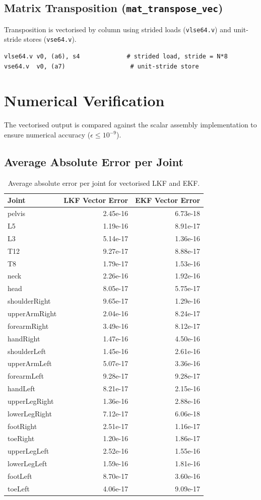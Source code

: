 \documentclass{article}
\begin{document}
\subsection{Matrix Transposition (\texttt{mat\_transpose\_vec})}
Transposition is vectorised by column using strided loads (\texttt{vlse64.v}) and unit-stride stores (\texttt{vse64.v}).
\begin{verbatim}
vlse64.v v0, (a6), s4             # strided load, stride = N*8
vse64.v  v0, (a7)                  # unit-stride store
\end{verbatim}

\section{Numerical Verification}
The vectorised output is compared against the scalar assembly implementation to ensure numerical accuracy ($\epsilon \le 10^{-9}$).

\subsection{Average Absolute Error per Joint}
\begin{table}[ht]
\centering
\begin{tabular}{|l|r|r|}
\hline
Joint & LKF Vector Error & EKF Vector Error \\
\hline
pelvis & 2.45e-16 & 6.73e-18 \\
L5 & 1.19e-16 & 8.91e-17 \\
L3 & 5.14e-17 & 1.36e-16 \\
T12 & 9.27e-17 & 8.88e-17 \\
T8 & 1.79e-17 & 1.53e-16 \\
neck & 2.26e-16 & 1.92e-16 \\
head & 8.05e-17 & 5.75e-17 \\
shoulderRight & 9.65e-17 & 1.29e-16 \\
upperArmRight & 2.04e-16 & 8.24e-17 \\
forearmRight & 3.49e-16 & 8.12e-17 \\
handRight & 1.47e-16 & 4.50e-16 \\
shoulderLeft & 1.45e-16 & 2.61e-16 \\
upperArmLeft & 5.07e-17 & 3.36e-16 \\
forearmLeft & 9.28e-17 & 9.28e-17 \\
handLeft & 8.21e-17 & 2.15e-16 \\
upperLegRight & 1.36e-16 & 2.88e-16 \\
lowerLegRight & 7.12e-17 & 6.06e-18 \\
footRight & 2.51e-17 & 1.16e-17 \\
toeRight & 1.20e-16 & 1.86e-17 \\
upperLegLeft & 2.52e-16 & 1.55e-16 \\
lowerLegLeft & 1.59e-16 & 1.81e-16 \\
footLeft & 8.70e-17 & 3.60e-16 \\
toeLeft & 4.06e-17 & 9.09e-17 \\
\hline
\end{tabular}
\caption{Average absolute error per joint for vectorised LKF and EKF.}
\end{table}
\end{document}

